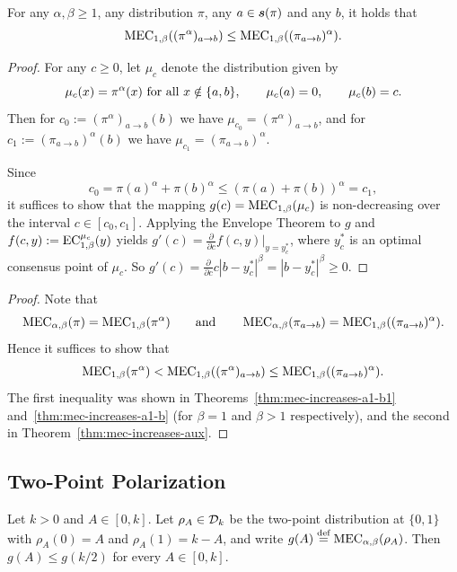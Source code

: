 \begin{theorem}\label{thm:mec-increases-aux}
For any $\alpha,\beta\geq 1$, any distribution $\pi$, any $a\in\boldsymbol{s}(\pi)$ and any $b$, it holds that
\[
\MEC[1,\beta]((\pi^\alpha)_{a\to b}) \leq \MEC[1,\beta]((\pi_{a\to b})^\alpha).
\]
\end{theorem}
\begin{proof}
For any $c\ge 0$, let $\mu_c$ denote the distribution given by
\[
\mu_c(x)=\pi^\alpha(x) \text{ for all } x\notin \set{a,b},
\qquad
\mu_c(a)=0,
\qquad
\mu_c(b)=c.
\]
Then for $c_0:=(\pi^\alpha)_{a\to b}(b)$ we have $\mu_{c_0}=(\pi^\alpha)_{a\to b}$, and for $c_1:= (\pi_{a\to b})^\alpha(b)$ we have $\mu_{c_1} = (\pi_{a\to b})^\alpha$.

Since
\[
 c_0=\pi(a)^\alpha + \pi(b)^\alpha \leq (\pi(a)+\pi(b))^\alpha = c_1,
\]
it suffices to show that the mapping $g(c)=\MEC[1,\beta](\mu_c)$ is non-decreasing over the interval $c\in[c_0, c_1]$. Applying the Envelope Theorem to $g$ and $f(c,y) := \EC[1,\beta][\mu_c](y)$ yields $g'(c) =\frac{\partial}{\partial c} f(c, y)|_{y=y^*_c}$, where $y^*_c$ is an optimal consensus point of $\mu_c$.
So $g'(c) = \frac{\partial}{\partial c} c |b-y^*_c|^\beta = |b-y^*_c|^\beta \geq 0$.
\end{proof}

\shiftingAway*
\begin{proof}
Note that
\[
\MEC(\pi) = \MEC[1,\beta](\pi^\alpha)
\qquad\text{and}\qquad
\MEC(\pi_{a\to b})=\MEC[1,\beta]((\pi_{a\to b})^\alpha).
\]
Hence it suffices to show that 
\[
\MEC[1,\beta](\pi^\alpha) < \MEC[1,\beta]((\pi^\alpha)_{a\to b}) \leq \MEC[1,\beta]((\pi_{a\to b})^\alpha).
\]
The first inequality was shown in Theorems~\ref{thm:mec-increases-a1-b1} and~\ref{thm:mec-increases-a1-b} (for $\beta=1$ and $\beta>1$ respectively), and the second in Theorem~\ref{thm:mec-increases-aux}.
\end{proof}

\subsection{Two-Point Polarization}

\begin{lemma}\label{lem:two-point-max-simple}
Let \(k>0\) and \(A\in[0,k]\). Let \(\rho_A\in\mathcal{D}_k\) be the two-point distribution at $\{0,1\}$ with $\rho_A(0)=A$ and $\rho_A(1)=k-A$, and write \(g(A)\defsymbol \MEC(\rho_A)\). Then \(g(A)\le g(k/2)\) for every \(A\in[0,k]\).
\end{lemma}

